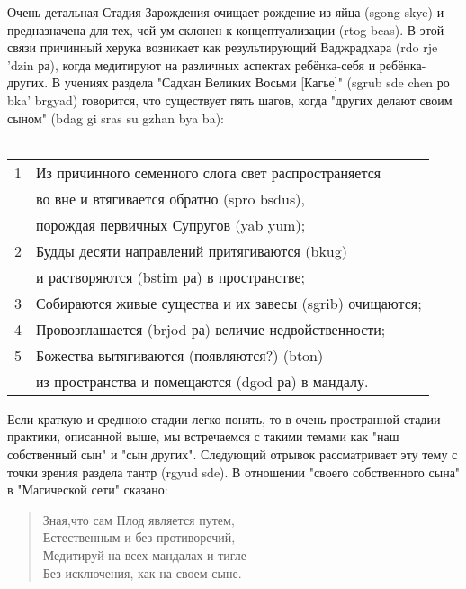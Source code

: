 \newpage
{}
\Vspace{1cm}
Очень детальная Стадия Зарождения очищает рождение из яйца (sgong skye) и
предназначена для тех, чей ум склонен к концептуализации (rtog bcas). В этой связи
причинный херука возникает как результирующий Ваджрадхара (rdo rje 'dzin ра), когда
медитируют на различных аспектах ребёнка-себя и ребёнка-других. В учениях раздела
"Садхан Великих Восьми [Кагье]" (sgrub sde chen ро bka' brgyad) говорится, что существует
пять шагов, когда "других делают своим сыном" (bdag gi sras su gzhan bya ba):\\
\\
\begin{tabular}{ll}
1 & Из причинного семенного слога свет распространяется \\
  & во вне и втягивается обратно (spro bsdus), \\
  & порождая первичных Супругов (yab yum);\\
2 & Будды десяти направлений притягиваются (bkug) \\
  & и растворяются (bstim ра) в пространстве;\\
3 & Собираются живые существа и их завесы (sgrib) очищаются;\\
4 & Провозглашается (brjod ра) величие недвойственности;\\
5 & Божества вытягиваются (появляются?) (bton) \\
  & из пространства и помещаются (dgod ра) в мандалу.\\
\end{tabular}

\begin{siderules}
Если краткую и среднюю стадии легко понять, то в очень пространной стадии практики,
описанной выше, мы встречаемся с такими темами как "наш собственный сын" и "сын
других". Следующий отрывок рассматривает эту тему с точки зрения раздела тантр
(rgyud sde). В отношении "своего собственного сына" в "Магической сети" сказано:
\begin{verse}
Зная,что сам Плод является путем,\\
Естественным и без противоречий,\\
Медитируй на всех мандалах и тигле\\
Без исключения, как на своем сыне.\\
\end{verse}
\end{siderules}

